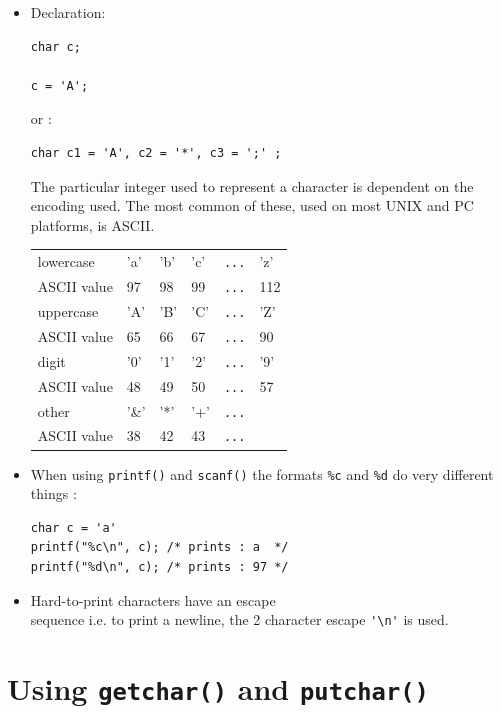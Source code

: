 \documentclass[a4,portraitt]{slides}
\begin{document}
\newpage
\begin{itemize}
\item Declaration:
\begin{verbatim}
char c;

c = 'A';
\end{verbatim}
or :
\begin{verbatim}
char c1 = 'A', c2 = '*', c3 = ';' ;
\end{verbatim}

The particular integer used to represent a character
is dependent on the encoding used. The most common
of these, used on most UNIX and PC platforms, is ASCII.

\begin{center}
\begin{tabular}{|l|lllll|}\hline
lowercase   & 'a' & 'b' & 'c' & \verb^...^ & 'z' \\
ASCII value & 97  &  98 &  99 & \verb^...^ & 112 \\ \hline
uppercase   & 'A' & 'B' & 'C' & \verb^...^ & 'Z' \\
ASCII value & 65  &  66 &  67 & \verb^...^ &  90 \\ \hline
digit       & '0' & '1' & '2' & \verb^...^ & '9' \\
ASCII value & 48  &  49 &  50 & \verb^...^ &  57 \\ \hline
other       & '\&' & '*' & '+' & \verb^...^ & \\
ASCII value & 38  &  42 &  43 & \verb^...^ & \\ \hline
\end{tabular}
\end{center}

\item When using \verb^printf()^ and \verb^scanf()^ the formats
\verb^%c^ and \verb^%d^ do very different things :
\begin{verbatim}
char c = 'a'
printf("%c\n", c); /* prints : a  */
printf("%d\n", c); /* prints : 97 */
\end{verbatim}

\item Hard-to-print characters have an escape\\ sequence
i.e. to print a newline, the 2 character escape \verb^'\n'^ is used.
\end{itemize}

\newpage
\section*{Using {\tt getchar()} and {\tt putchar()}}
\end{document}
